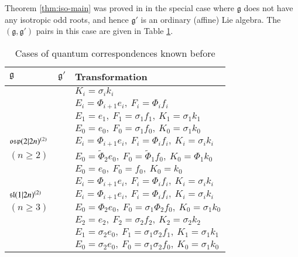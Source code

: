 \documentclass[12pt]{amsart}
\theoremstyle{definition}
\theoremstyle{remark}
\numberwithin{equation}{section}
\begin{document}
Theorem \ref{thm:iso-main} was proved in \cite{Z3, Z2}
in the special case where ${{\mathfrak g}}$ does not have any isotropic odd roots, 
and hence ${{\mathfrak g}}'$ is an ordinary (affine) Lie algebra. 
The $({{\mathfrak g}}, {{\mathfrak g}}')$ pairs in this case are given in Table \ref{table:nonisotropic}.
\begin{table}[h]
\caption{Cases of quantum correspondences known before}
\label{table:nonisotropic}
\begin{tabular}{>{\centering\arraybackslash}m{1.2in}|>{\centering\arraybackslash}m{0.8in}|>{\centering\arraybackslash}m{3in}}
\hline
\vspace{2mm}
${{\mathfrak g}}$ \vspace{2mm}& ${{\mathfrak g}}'$& Transformation  \\
\hline
\multirow{2}{*}{${{\rm\mathfrak{osp}}}(1|2n)$} & \multirow{2}{*}{$B_n$ }            & $K_i=\sigma_ik_i$\\
                                              &  & $E_i=\Phi_{i+1}e_i, \ F_i=\Phi_if_i$\\

\hline
\multirow{2}{*}{${{\rm\mathfrak{osp}}}(2|2)^{(2)}$} & \multirow{2}{*}{ $A_1^{(1)}$  }      & $E_1= e_1, \  F_1=\sigma_1f_1,\   K_1=\sigma_1k_1$\\
                                                     & &$E_0= e_0,\  F_0=\sigma_1f_0, \  K_0=\sigma_1k_0$ \\

\hline
${{\rm\mathfrak{osp}}}(2|2n)^{(2)}$ & \multirow{2}{*}{ $D_{n+1}^{(2)}$ }        &$ E_i=\Phi_{i+1}e_i, \   F_i=\Phi_if_i,\   K_i=\sigma_ik_i$ \\
$(n\ge2)$              &  & $ E_0=\tilde{\Phi}_2e_0,\  F_0=\tilde{\Phi}_1f_0,\   K_0=\Phi_1k_0$\\

\hline
\multirow{2}{*}{${{\rm\mathfrak{osp}}}(1|2n)^{(1)}$}   & \multirow{2}{*}{ $A_{2n}^{(2)}$  }     & $ E_0=e_0,\   F_0=f_0, \  K_0= k_0$ \\
                                                        &  & $ E_i= \Phi_{i+1}e_i, \  F_i= \Phi_if_i,\  K_i=\sigma_ik_i$\\

\hline
${{\rm\mathfrak{sl}}}(1|2n)^{(2)}$     & \multirow{2}{*}{ $B_n^{(1)}$  }             & $ E_i=\Phi_{i+1}e_i, \  F_i=\Phi_if_i,\  K_i=\sigma_ik_i$ \\
$(n\geq 3)$            &    & $ E_0=\Phi_2e_0,\  F_0=\sigma_1\Phi_2f_0,
\  K_0=\sigma_1k_0$\\

\hline
\multirow{3}{*}{${{\rm\mathfrak{sl}}}(1|4)^{(2)}$}  & \multirow{3}{*}{$C_2^{(1)}$ } &  $E_2=e_2,\   F_2=\sigma_2f_2,\ K_2=\sigma_2k_2$  \\
                                                   &  & $E_1=\sigma_2e_0,\  F_1=\sigma_1\sigma_2f_1,\  K_1=\sigma_1k_1$\\
                                                   &  & $ E_0=\sigma_2e_0, \  F_0=\sigma_1\sigma_2f_0, \  K_0=\sigma_1k_0$ \\

\hline
\end{tabular}
\end{table}
\end{document}
